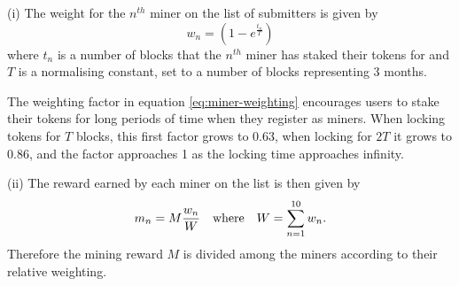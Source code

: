 \noindent (i) The weight for the $n^{th}$ miner on the list of submitters is given by
\begin{equation}\label{eq:miner-weighting}
 w_n = \left(1 - e^{\frac{t_n}{T}}\right) %
\end{equation}
where $t_n$ is a number of blocks that the $n^{th}$ miner has staked their tokens for and $T$ %
is a normalising constant, set to a number of blocks representing 3 months.%

The weighting factor in equation \eqref{eq:miner-weighting} encourages users to stake their tokens for long periods of time when they register as miners. When locking tokens for $T$ blocks, this first factor grows to 0.63, when locking for $2T$ it grows to 0.86, and the factor approaches 1 as the locking time approaches infinity.%

\noindent (ii) The reward earned by each miner on the list is then given by
\begin{equation}\label{eq:miner-payout}
 m_n = M \frac{w_n}{W} \quad \textnormal{where} \quad W = \sum_{n=1}^{10} w_n.
\end{equation}
Therefore the mining reward $M$ is divided among the miners according to their relative weighting. 